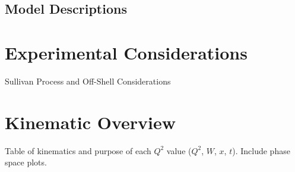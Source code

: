 \hypertarget{model-descriptions-1}{%
\subsection{Model Descriptions}\label{model-descriptions-1}}

\hypertarget{Section-3.5}{%
\section{Experimental Considerations}\label{Section-3.5}}

Sullivan Process and Off-Shell Considerations

\hypertarget{Section-3.6}{%
\section{Kinematic Overview}\label{Section-3.6}}

Table of kinematics and purpose of each \(Q^2\) value (\(Q^2\), \(W\),
\(x\), \(t\)). Include phase space plots.

